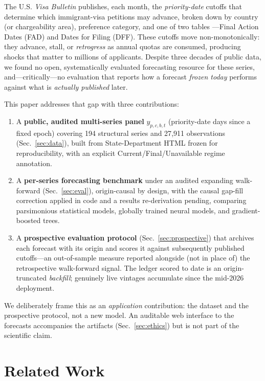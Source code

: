 \documentclass[runningheads]{llncs}
\begin{document}
The U.S. \emph{Visa Bulletin} publishes, each month, the \emph{priority-date}
cutoffs that determine which immigrant-visa petitions may advance, broken down by
country (or chargeability area), preference category, and one of two tables
---Final Action Dates (FAD) and Dates for Filing (DFF). These cutoffs move
non-monotonically: they advance, stall, or \emph{retrogress} as annual quotas are
consumed, producing shocks that matter to millions of applicants. Despite three
decades of public data, we found no open, systematically evaluated forecasting
resource for these series, and---critically---no evaluation that reports how a
forecast \emph{frozen today} performs against what is \emph{actually published}
later.

This paper addresses that gap with three contributions:
\begin{enumerate}
  \item A \textbf{public, audited multi-series panel} $y_{p,c,b,t}$ (priority-date
  days since a fixed epoch) covering 194 structural series and 27{,}911
  observations (Sec.~\ref{sec:data}), built from State-Department HTML frozen for
  reproducibility, with an explicit Current/Final/Unavailable regime annotation.
  \item A \textbf{per-series forecasting benchmark} under an audited expanding
  walk-forward (Sec.~\ref{sec:eval}), origin-causal by design, with the causal
  gap-fill correction applied in code and a results re-derivation pending,
  comparing parsimonious statistical models, globally trained neural models, and
  gradient-boosted trees.
  \item A \textbf{prospective evaluation protocol} (Sec.~\ref{sec:prospective})
  that archives each forecast with its origin and scores it against subsequently
  published cutoffs---an out-of-sample measure reported alongside (not in place
  of) the retrospective walk-forward signal. The ledger scored to date is an
  origin-truncated \emph{backfill}; genuinely live vintages accumulate since the
  mid-2026 deployment.
\end{enumerate}
We deliberately frame this as an \emph{application} contribution: the dataset and
the prospective protocol, not a new model. An auditable web interface to the
forecasts accompanies the artifacts (Sec.~\ref{sec:ethics}) but is not part of
the scientific claim.

\section{Related Work}
\label{sec:related}
\end{document}
